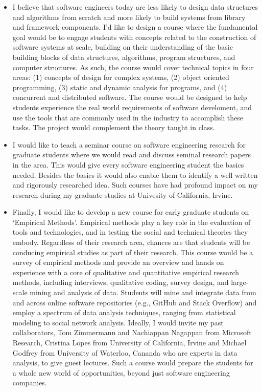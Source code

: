 \documentclass[a4paper]{article}
\begin{document}
\begin{itemize}

\item I believe that software engineers today are less likely to design data structures and algorithms from scratch and more likely to build systems from library and framework components.
I'd like to design a course where the fundamental goal would be to engage students  with concepts related to the construction of software systems at scale, building on their understanding of the basic building blocks of data structures, algorithms, program structures, and computer structures. 
As such, the course would cover technical topics in four areas: (1) concepts of design for complex systems, (2) object oriented programming, (3) static and dynamic analysis for programs, and (4) concurrent and distributed software.
The course would be designed to help students experience the real world requirements of software develoment, and use the tools that are commonly used in the industry to accomplish these tasks. The project would complement the theory taught in class.

\item I would like to teach a seminar course on software engineering research for graduate students where we would read and discuss seminal research papers in the area. This would give every software engineering student the basics needed. Besides the basics it would also enable them to identify a well written and rigorously researched idea. Such courses have had profound impact on my research during my graduate studies at Univesity of California, Irvine.

\item Finally, I would like to develop a new course for early graduate students
on ‘Empirical Methods’. Empirical methods play a key role in the evaluation of tools and technologies, and in testing the social and technical theories they embody. Regardless of their research area, chances are that students will be conducing empirical studies as part of their research. This course would be a survey of empirical methods and provide an overview and hands on experience with a core of qualitative and quantitative empirical research methods, including interviews, qualitative coding, survey design, and large-scale mining and analysis of data. Students will mine and integrate data from and across online software repositories (e.g., GitHub and Stack Overflow) and employ a spectrum of data analysis techniques, ranging from statistical modeling to social network analysis.
Ideally, I would invite my past collaborators, Tom Zimmermann and Nachiappan Nagappan from Microsoft Research, Cristina Lopes from University of California, Irvine and Michael Godfrey from University of Waterloo, Cananda who are experts in data analysis, to give guest lectures. Such a course would prepare the students for a whole new world of opportunities, beyond just software engineering companies.
\end{itemize}
\end{document}
